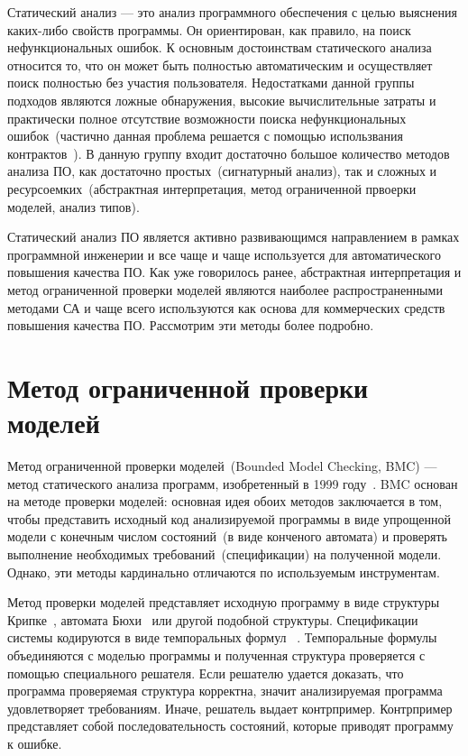 Статический анализ --- это анализ программного обеспечения с целью выяснения 
каких-либо свойств программы. Он ориентирован, как правило, на поиск
нефункциональных ошибок. К основным достоинствам статического анализа
относится то, что он может быть полностью автоматическим и осуществляет 
поиск полностью без участия пользователя. Недостатками данной группы подходов
являются ложные обнаружения, высокие вычислительные затраты и практически полное
отсутствие возможности поиска нефункциональных ошибок~(частично данная проблема 
решается с помощью использвания контрактов~\cite{designByContract}). В данную
группу входит достаточно большое количество методов анализа ПО, как достаточно
простых~(сигнатурный анализ), так и сложных и ресурсоемких~(абстрактная 
интерпретация, метод ограниченной првоерки моделей, анализ типов).

Статический анализ ПО является активно развивающимся направлением в рамках
программной инженерии и все чаще и чаще используется для автоматического 
повышения качества ПО. Как уже говорилось ранее, абстрактная интерпретация и 
метод ограниченной проверки моделей являются наиболее распространенными 
методами СА и чаще всего используются как основа для коммерческих средств
повышения качества ПО. Рассмотрим эти методы более подробно.

\section{Метод ограниченной проверки моделей}

Метод ограниченной проверки моделей~(Bounded Model Checking, BMC) --- метод
статического анализа программ, изобретенный в 1999 году~\cite{symbolicModelChecking}.
BMC основан на методе проверки моделей: основная идея обоих методов заключается
в том, чтобы представить исходный код анализируемой программы в виде упрощенной
модели с конечным числом состояний~(в виде конченого автомата) и проверять 
выполнение необходимых требований~(спецификации) на полученной модели. Однако, 
эти методы кардинально отличаются по используемым инструментам.

Метод проверки моделей представляет исходную программу в виде структуры 
Крипке~\cite{kripkeModel}, автомата Бюхи~\cite{buchiAutomata} или другой 
подобной структуры. Спецификации системы кодируются в виде темпоральных 
формул ~\cite{temporalLogic}. Темпоральные формулы объединяются с моделью программы и полученная структура проверяется с помощью специального решателя. 
Если решателю удается доказать, что программа проверяемая структура корректна, 
значит анализируемая программа удовлетворяет требованиям. Иначе, решатель выдает
контрпример. Контрпример представляет собой последовательность состояний,
которые приводят программу к ошибке.

